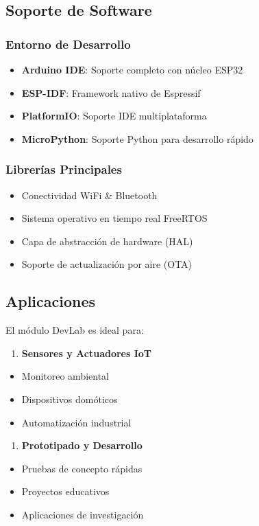 \documentclass[11pt,a4paper]{article}
\begin{document}
\subsection{Soporte de Software}

\subsubsection{Entorno de Desarrollo}
\begin{itemize}
\item \textbf{Arduino IDE}: Soporte completo con núcleo ESP32
\item \textbf{ESP-IDF}: Framework nativo de Espressif
\item \textbf{PlatformIO}: Soporte IDE multiplataforma
\item \textbf{MicroPython}: Soporte Python para desarrollo rápido
\end{itemize}

\subsubsection{Librerías Principales}
\begin{itemize}
\item Conectividad WiFi & Bluetooth
\item Sistema operativo en tiempo real FreeRTOS
\item Capa de abstracción de hardware (HAL)
\item Soporte de actualización por aire (OTA)
\end{itemize}

\subsection{Aplicaciones}

El módulo DevLab es ideal para:

\begin{enumerate}
\item \textbf{Sensores y Actuadores IoT}
\end{enumerate}
\begin{itemize}
\item Monitoreo ambiental
\item Dispositivos domóticos
\item Automatización industrial
\end{itemize}

\begin{enumerate}
\item \textbf{Prototipado y Desarrollo}
\end{enumerate}
\begin{itemize}
\item Pruebas de concepto rápidas
\item Proyectos educativos
\item Aplicaciones de investigación
\end{itemize}
\end{document}

